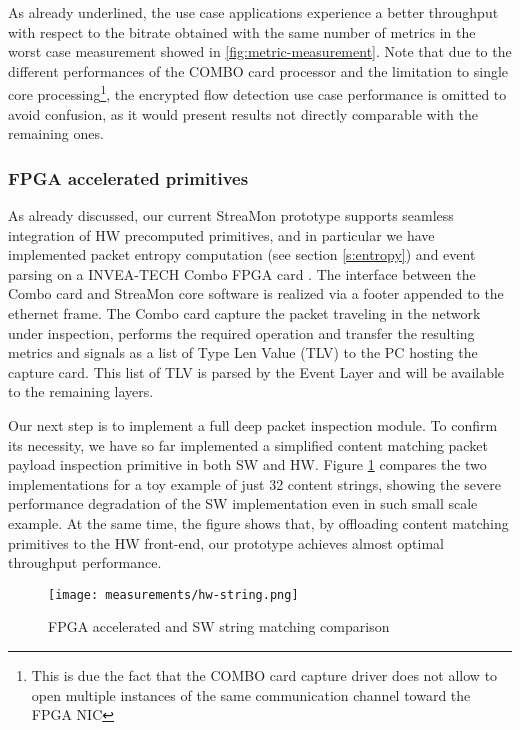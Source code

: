 \documentclass[conference,letterpaper]{sig-alternate-10pt}
\begin{document}
As already underlined, the use case applications experience a better throughput with respect to the bitrate obtained with the same number of metrics in the worst case measurement showed in \ref{fig:metric-measurement}. Note that due to the different performances of the COMBO card processor and the limitation to single core processing\footnote{This is due the fact that the COMBO card capture driver does not allow to open multiple instances of the same communication channel toward the FPGA NIC}, the encrypted flow detection use case performance is omitted to avoid confusion, as it would present results not directly comparable with the remaining ones. 

\subsubsection{FPGA accelerated primitives}
\label{s:fpga}
As already discussed, our current StreaMon prototype supports seamless integration of HW precomputed 
primitives, and in particular we have implemented packet entropy computation (see section \ref{s:entropy}) and event parsing on a INVEA-TECH Combo FPGA card \cite{invea}. The interface between the Combo card and StreaMon core software is realized via a footer appended to the ethernet frame. The Combo card capture the packet traveling in the network under inspection, performs the required operation and transfer the resulting metrics and signals as a list of Type Len Value (TLV) to the PC hosting the capture card. This list of TLV is parsed by the Event Layer and will be available to the remaining layers. 

Our next step is to implement a full deep packet inspection module. To confirm its necessity, we have so far implemented a simplified content matching packet payload inspection primitive in both SW and HW. Figure \ref{fig:string_matching} compares the two implementations for a toy example of just 32 content strings, showing the severe performance degradation of the SW implementation even in such small scale example. At the same time,  
the figure shows that, by offloading content matching primitives to the HW front-end, our prototype achieves almost optimal throughput performance. 

\begin{figure}[!t]
\centering
\texttt{[image: measurements/hw-string.png]}
\caption{FPGA accelerated and SW string matching comparison}
\vspace*{-.5cm}
\label{fig:string_matching}
\end{figure}
\end{document}

